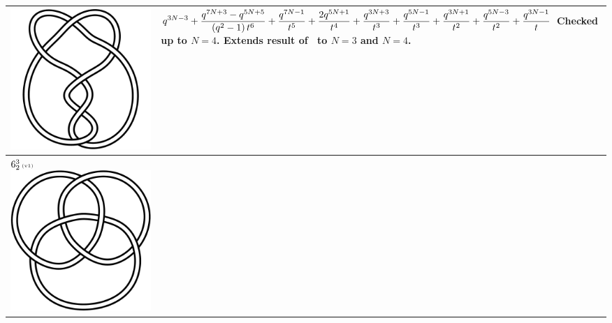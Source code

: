 \documentclass{compositio}
\theoremstyle{definition}
\numberwithin{equation}{section}
\begin{document}
{\begin{longtable}{p{}|p{}}
\includegraphics[scale=0.07,angle=0]{link6_2_2.pdf} 
& 
$
\displaystyle{%
q^{3 N-3}+\frac{q^{7 N+3}-q^{5 N+5}}{\left(q^2-1\right) t^6}+\frac{q^{7 N-1}}{t^5}+\frac{2 q^{5 N+1}}{t^4}+\frac{q^{3 N+3}}{t^3}+\frac{q^{5 N-1}}{t^3}+\frac{q^{3 N+1}}{t^2}+\frac{q^{5 N-3}}{t^2}+\frac{q^{3 N-1}}{t}
}
$
\newline\newline\newline\newline
Checked up to $N=4$. Extends result of~\cite{r0508510} to $N=3$ and $N=4$.
\\
\hline
$6_{2}^3\,\text{{\tiny (v1)}}$ 
\includegraphics[scale=0.07,angle=0]{link6_2_3.pdf} 

\end{longtable}}
\end{document}
